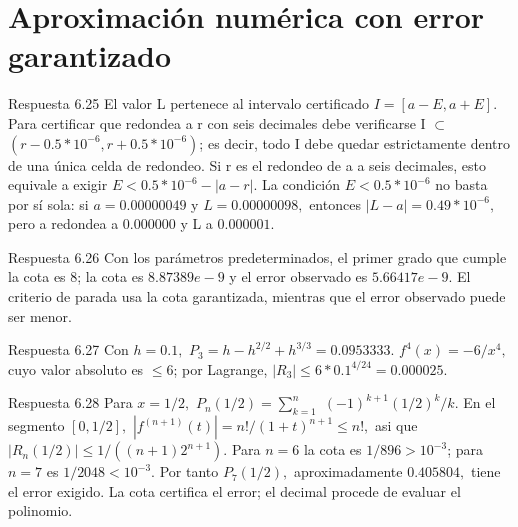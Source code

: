 \documentclass[10pt,a4paper,oneside,openany]{book}
\begin{document}
\section{Aproximación numérica con error garantizado}
\begin{PSevenAnswerFixed}{Respuesta 6.25}
El valor L pertenece al intervalo certificado \(I=[a-E,a+E]\). Para certificar que redondea a r con seis decimales debe verificarse I \(\subset \) \((r-0.5*10^{-6},r+0.5*10^{-6})\); es decir, todo I debe quedar estrictamente dentro de una única celda de redondeo. Si r es el redondeo de a a seis decimales, esto equivale a exigir \(E<0.5*10^{-6}-|a-r|\). La condición \(E<0.5*10^{-6}\) no basta por sí sola: si \(a=0.00000049\) y \(L=0.00000098,\) entonces \(|L-a|=0.49*10^{-6},\) pero a redondea a \(0.000000\) y L a \(0.000001\).
\end{PSevenAnswerFixed}
\begin{PSevenAnswerFixed}{Respuesta 6.26}
Con los parámetros predeterminados, el primer grado que cumple la cota es \(8\); la cota es \(8.87389e-9\) y el error observado es \(5.66417e-9\). El criterio de parada usa la cota garantizada, mientras que el error observado puede ser menor.
\end{PSevenAnswerFixed}
\begin{PSevenAnswerFixed}{Respuesta 6.27}
Con \(h=0.1,\) \(P_3=h-h^{2/2}+h^{3/3}=0.0953333\). \(f^{4}(x)=-6/x^{4},\) cuyo valor absoluto es \(\le 6\); por Lagrange, \(|R_3|\le 6*0.1^{4/24}=0.000025\).
\end{PSevenAnswerFixed}
\begin{PSevenAnswerFixed}{Respuesta 6.28}
Para \(x=1/2,\) \(P_n(1/2)=\sum_{k=1}^n\) \((-1)^{k+1}(1/2)^k/k\). En el segmento \([0,1/2],\) \(|f^{(n+1)}(t)|=n!/(1+t)^{n+1}\le n!,\) asi que \(|R_n(1/2)|\le 1/((n+1)2^{n+1})\). Para \(n=6\) la cota es \(1/896>10^{-3}\); para \(n=7\) es \(1/2048<10^{-3}\). Por tanto \(P_7(1/2),\) aproximadamente \(0.405804,\) tiene el error exigido. La cota certifica el error; el decimal procede de evaluar el polinomio.
\end{PSevenAnswerFixed}
\end{document}
